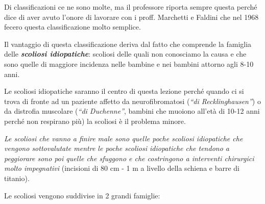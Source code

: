 Di classificazioni ce ne sono molte, ma il professore riporta sempre questa
perché dice di aver avuto l'onore di lavorare con i proff. Marchetti e
Faldini che nel 1968 fecero questa classificazione molto semplice.

Il vantaggio di questa classificazione deriva dal fatto che comprende la
famiglia delle \textbf{\emph{scoliosi idiopatiche}}: scoliosi delle
quali non conosciamo la causa e che sono quelle di maggiore incidenza
nelle bambine e nei bambini attorno agli 8-10 anni.

Le scoliosi idiopatiche saranno il centro di questa lezione perché
quando ci si trova di fronte ad un paziente affetto da neurofibromatosi
(\emph{``di Recklinghausen''}) o da distrofia muscolare (\emph{``di
Duchenne''}, bambini che muoiono all'età di 10-12 anni perché non
respirano più) la scoliosi è il problema minore.

\emph{Le scoliosi che vanno a finire male sono quelle poche scoliosi
idiopatiche che vengono sottovalutate mentre le poche scoliosi
idiopatiche che tendono a peggiorare sono poi quelle che sfuggono e che
costringono a interventi chirurgici molto impegnativi} (incisioni di 80
cm - 1 m a livello della schiena e barre di titanio).

Le scoliosi vengono suddivise in 2 grandi famiglie:

